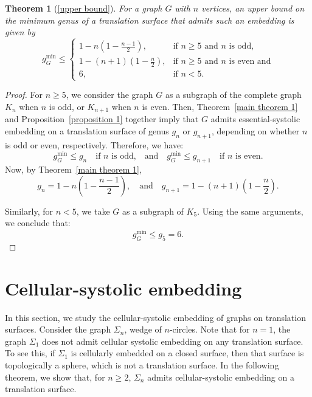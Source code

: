 \documentclass[11pt]{amsart}
\theoremstyle{plain}
\newtheorem*{repthm}{Theorem}
\theoremstyle{definition}
\theoremstyle{remark}
\numberwithin{equation}{section}
\numberwithin{figure}{section}
\begin{document}
\begin{repthm}[\ref{upper bound}]
For a graph \( G \) with \( n \) vertices, an upper bound on the minimum genus of a translation surface that admits such an embedding is given by
 \[
g^{\min}_G \leq 
\begin{cases}
1 - n\left(1 - \frac{n - 1}{2}\right), & \text{if } n \geq 5 \text{ and } n \text{ is odd}, \\[0.5em]
1 - (n + 1)\left(1 - \frac{n}{2}\right), & \text{if } n \geq 5 \text{ and } n \text{ is even and} \\[0.5em]
6, & \text{if } n < 5.
\end{cases}
\]

\end{repthm}

\begin{proof}

For $n \geq 5$, we consider the graph $G$ as a subgraph of the complete graph $K_n$ when $n$ is odd, or $K_{n+1}$ when $n$ is even. Then, Theorem~\ref{main theorem 1} and Proposition~\ref{proposition 1} together imply that $G$ admits essential-systolic embedding on a translation surface of genus $g_n$ or $g_{n+1}$, depending on whether $n$ is odd or even, respectively. Therefore, we have: $$
g^{\min}_G \leq g_n \quad \text{if } n \text{ is odd,} \quad \text{and} \quad g^{\min}_G \leq g_{n+1} \quad \text{if } n \text{ is even}.$$
Now, by Theorem~\ref{main theorem 1}, $$g_n = 1 - n\left(1 - \frac{n - 1}{2}\right), \quad \text{and} \quad g_{n+1} = 1 - (n + 1)\left(1 - \frac{n}{2}\right).$$

Similarly, for $n < 5$, we take $G$ as a subgraph of $K_5$. Using the same arguments, we conclude that:$$g^{\min}_G \leq g_{5} = 6.$$

\end{proof}

\section{Cellular-systolic embedding}

In this section, we study the cellular-systolic embedding of graphs on translation surfaces. Consider the graph $\Sigma_n$, wedge of $n$-circles. Note that for $n=1$, the graph $\Sigma_1$ does not admit cellular systolic embedding on any translation surface. To see this, if $\Sigma_1$ is cellularly embedded on a closed surface, then that surface is topologically a sphere, which is not a translation surface. In the following theorem, we show that, for $n\geq 2$, $\Sigma_n$ admits cellular-systolic embedding on a translation surface.
\end{document}
